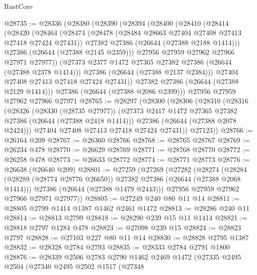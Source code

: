 \begin{lexlean}{RustCore}
\begin{coremodule}
@28735 := @28336
    (@28380
      (@28390
        (@28394
          (@28400
            (@28410
              (@28414
                (@28420
                  (@28464
                    (@28474
                      (@28478 (@28484 @28663 @27404 @27408 @27413 @27418 @27424 @27431))
                      @27382
                      @27386
                      (@26644 (@27388 @2188 @1414)))
                    @27386
                    (@26644 (@27388 @2145 @2359)))
                  @27956
                  @27959
                  @27962
                  @27966
                  @27971
                  @27977))
              (@27373 @2377 @1472 @27365 @27382 @27386 (@26644 (@27388 @2378 @1414)))
              @27386
              (@26644 (@27388 @2137 @2384)))
            @27404
            @27408
            @27413
            @27418
            @27424
            @27431))
        @27382
        @27386
        (@26644 (@27388 @2129 @1414)))
      @27386
      (@26644 (@27388 @2086 @2399)))
    @27956
    @27959
    @27962
    @27966
    @27971
@28765 := @28297
    (@28300
      (@28306
        (@28310
          (@28316
            (@28326
              (@28330 (@28735 @27977))
              (@27373 @2417 @1472 @27365 @27382 @27386 (@26644 (@27388 @2418 @1414)))
              @27386
              (@26644 (@27388 @2078 @2424)))
            @27404
            @27408
            @27413
            @27418
            @27424
            @27431))
        @27123))
@28766 := @26164 @209
@28767 := @26360 @28766
@28768 := @28765 @28767
@28769 := @26234 @478
@28770 := @26629 @28769
@28771 := @28768 @28770
@28772 := @26258 @478
@28773 := @26633 @28772
@28774 := @28771 @28773
@28776 := @26638 (@26640 @209)
@28801 := @27259
    (@27269
      (@27282
        (@28274
          (@28284 (@28289 (@28774 @28776 @26650)) @27382 @27386 (@26644 (@27388 @2068 @1414)))
          @27386
          (@26644 (@27388 @1479 @2443)))
        @27956
        @27959
        @27962
        @27966
        @27971
        @27977))
@28805 := @27249 @240 @80 @11 @14
@28811 := @28805 @2799 @1414 @1387 @1462 @2461 @1472
@28813 := @28286 @240 @11
@28814 := @28813 @2799
@28818 := @28290 @239 @15 @11 @1414
@28821 := @28818 @2797 @1284 @478
@28823 := @27098 @239 @15
@28824 := @28823 @2797
@28828 := @27103 @227 @80 @11 @14
@28830 := @28828 @2795 @1387
@28832 := @28328 @2784 @2793
@28835 := @28333 @2784 @2791 @1800
@28876 := @28339
    @2506
    @2783
    @2790
    @1462
    @2469
    @1472
    (@27335
      @2495
      @2504
      (@27340
        @2495
        @2502
        @1517
        (@27348

\end{coremodule}
\end{lexlean}
